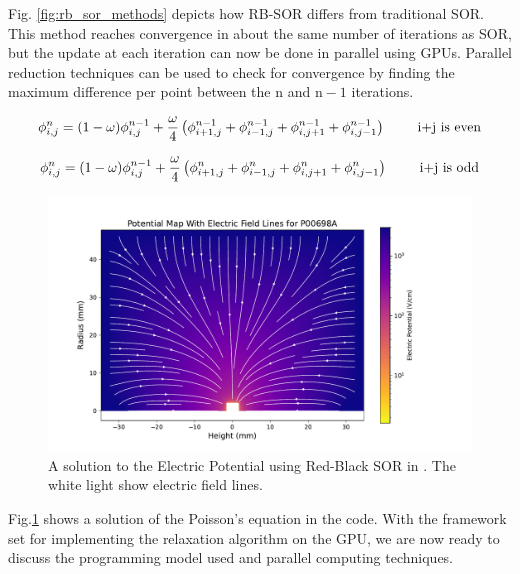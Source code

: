 Fig. \ref{fig:rb_sor_methods} depicts how RB-SOR differs from traditional SOR. This method reaches convergence in about the same number of iterations as SOR, but the update at each iteration can now be done in parallel using GPUs. Parallel reduction techniques can be used to check for convergence by finding the maximum difference per point between the $\text{n}$ and $\text{n}-1$ iterations. 

\begin{equation}{\label{rb_e}}
 \phi_{i,j}^{n} = (1-\omega)\phi^{n-1}_{i,j} + \frac{\omega}{4} \left(\phi^{n-1}_{i+1,j} + \phi^{n-1}_{i-1,j} + \phi^{n-1}_{i,j+1} + \phi^{n-1}_{i,j-1} \right) \qquad \text{ i+j is even}
\end{equation}

\begin{equation}{\label{rb_o}}
 \phi_{i,j}^{n} = (1-\omega)\phi^{n-1}_{i,j} + \frac{\omega}{4} \left(\phi^{n}_{i+1,j} + \phi^n_{i-1,j} + \phi^{n}_{i,j+1} + \phi^n_{i,j-1} \right) \qquad \text{ i+j is odd}
\end{equation}

\begin{figure}[!htb]
\centering
 \includegraphics[width=\linewidth]{ch4/figs/elect_pot_P00698A.pdf}
\caption{\label{fig:sor_pot_sol} A solution to the Electric Potential using Red-Black SOR in {\ehd}. The white light show electric field lines.}
\label{ch4:fig:elect_pot_soln}
\end{figure}

Fig.\ref{ch4:fig:elect_pot_soln} shows a solution of the Poisson's equation in the code. With the framework set for implementing the relaxation algorithm on the GPU, we are now ready to discuss the programming model used and parallel computing techniques.



